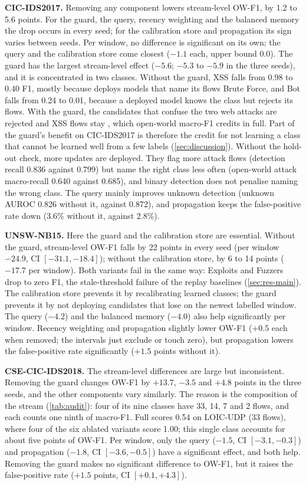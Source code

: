 \textbf{CIC-IDS2017.} Removing any component lowers stream-level OW-F1, by 1.2 to 5.6 points. For the guard, the
query, recency weighting and the balanced memory the drop occurs in every seed; for the calibration store and
propagation its sign varies between seeds. Per window, no difference is significant on its own; the query and
the calibration store come closest ($-1.1$ each, upper bound 0.0). The guard has the largest stream-level effect
($-5.6$; $-5.3$ to $-5.9$ in the three seeds), and it is concentrated in two classes. Without the guard, XSS falls
from 0.98 to 0.40 F1, mostly because \nova{} deploys models that name its flows Brute Force, and Bot falls from 0.24
to 0.01, because a deployed model knows the class but rejects its flows. With the guard, the candidates that
confuse the two web attacks are rejected and XSS flows stay \unk{}, which open-world macro-F1 credits in full. Part
of the guard's benefit on CIC-IDS2017 is therefore the credit for not learning a class that cannot be learned well
from a few labels (\cref{sec:discussion}). Without the hold-out check, more updates are deployed. They flag more
attack flows (detection recall 0.836 against 0.799) but name the right class less often (open-world attack
macro-recall 0.640 against 0.685), and binary detection does not penalise naming the wrong class. The query mainly
improves unknown detection (unknown AUROC 0.826 without it, against 0.872), and propagation keeps the
false-positive rate down (3.6\% without it, against 2.8\%).

\textbf{UNSW-NB15.} Here the guard and the calibration store are essential. Without the guard, stream-level OW-F1
falls by 22 points in every seed (per window $-24.9$, CI $[-31.1, -18.4]$); without the calibration store, by 6 to
14 points ($-17.7$ per window). Both variants fail in the same way: Exploits and Fuzzers drop to zero F1, the
stale-threshold failure of the replay baselines (\cref{sec:res-main}). The calibration store prevents it by
recalibrating learned classes; the guard prevents it by not deploying candidates that lose on the newest labelled
window. The query ($-4.2$) and the balanced memory ($-4.0$) also help significantly per window. Recency weighting and
propagation slightly lower OW-F1 ($+0.5$ each when removed; the intervals just exclude or touch zero), but
propagation lowers the false-positive rate significantly ($+1.5$ points without it).

\textbf{CSE-CIC-IDS2018.} The stream-level differences are large but inconsistent. Removing the guard changes OW-F1
by $+13.7$, $-3.5$ and $+4.8$ points in the three seeds, and the other components vary similarly. The reason is the
composition of the stream (\cref{tab:audit}): four of its nine classes have 33, 14, 7 and 2 flows, and each
counts one ninth of macro-F1. Full \nova{} scores 0.54 on LOIC-UDP (33 flows), where four of the six ablated
variants score 1.00; this single class accounts for about five points of OW-F1. Per window, only the query
($-1.5$, CI $[-3.1, -0.3]$) and propagation ($-1.8$, CI $[-3.6, -0.5]$) have a significant effect, and both help.
Removing the guard makes no significant difference to OW-F1, but it raises the false-positive rate ($+1.5$ points,
CI $[+0.1, +4.3]$).

